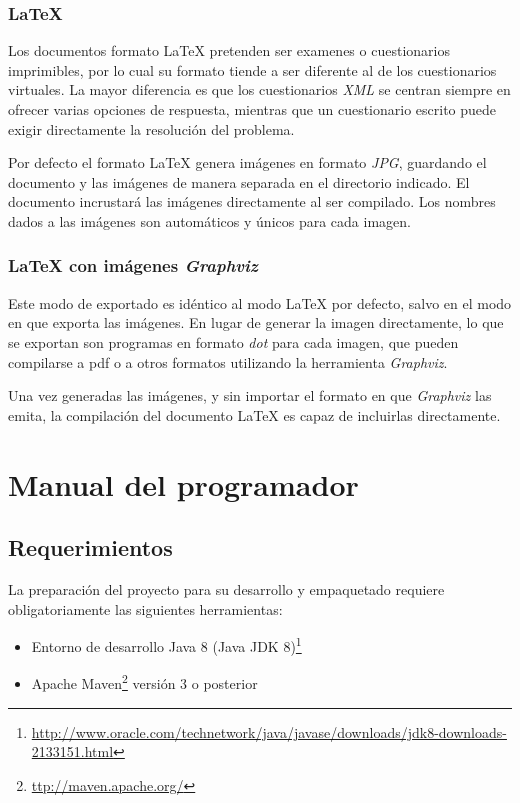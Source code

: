 
\subsubsection{\LaTeX{}}
Los documentos formato \LaTeX{} pretenden ser examenes o cuestionarios imprimibles, por lo cual su formato tiende a ser diferente al de los cuestionarios virtuales.
La mayor diferencia es que los cuestionarios \emph{XML} se centran siempre en ofrecer varias opciones de respuesta, mientras que un cuestionario escrito puede exigir directamente la resolución del problema.

Por defecto el formato \LaTeX{} genera imágenes en formato \emph{JPG}, guardando el documento y las imágenes de manera separada en el directorio indicado.
El documento incrustará las imágenes directamente al ser compilado.
Los nombres dados a las imágenes son automáticos y únicos para cada imagen.

\subsubsection{\LaTeX{} con imágenes \emph{Graphviz}}
Este modo de exportado es idéntico al modo \LaTeX{} por defecto, salvo en el modo en que exporta las imágenes.
En lugar de generar la imagen directamente, lo que se exportan son programas en formato \emph{dot} para cada imagen, que pueden compilarse a pdf o a otros formatos utilizando la herramienta \emph{Graphviz}.

Una vez generadas las imágenes, y sin importar el formato en que \emph{Graphviz} las emita, la compilación del documento \LaTeX{} es capaz de incluirlas directamente.

\section{Manual del programador}

\subsection{Requerimientos}
La preparación del proyecto para su desarrollo y empaquetado requiere obligatoriamente las siguientes herramientas:
\begin{itemize}
	\item Entorno de desarrollo Java 8 (Java JDK 8)\footnote{\url{http://www.oracle.com/technetwork/java/javase/downloads/jdk8-downloads-2133151.html}}
	\item Apache Maven\footnote{\url{ttp://maven.apache.org/}} versión 3 o posterior
\end{itemize}

